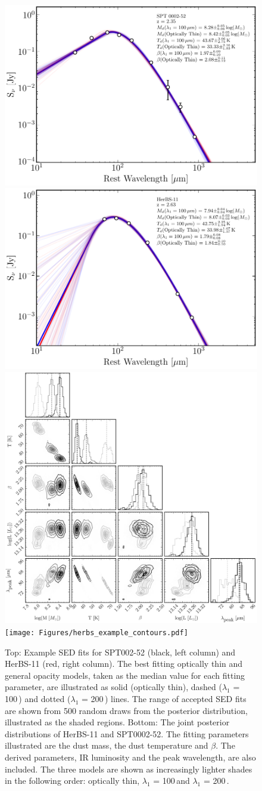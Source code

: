 \begin{figure}
	\centering
	\includegraphics[width=0.49\columnwidth]{Figures/spt_sed_example.pdf}
	\includegraphics[width=0.49\columnwidth]{Figures/herbs_sed_example.pdf}
	\includegraphics[width=0.49\columnwidth]{Figures/spt_example_contours.pdf}
	\texttt{[image: Figures/herbs\_example\_contours.pdf]}
	\caption{Top: Example SED fits for SPT002-52 (black, left column) and HerBS-11 (red, right column). The best fitting optically thin and general opacity models, taken as the median value for each fitting parameter, are illustrated as solid (optically thin), dashed ($\lambda_1$ = 100\,\micron) and dotted ($\lambda_1$ = 200\,\micron) lines. The range of accepted SED fits are shown from 500 random draws from the posterior distribution, illustrated as the shaded regions. Bottom: The joint posterior distributions of HerBS-11 and SPT0002-52. The fitting parameters illustrated are the dust mass, the dust temperature and $\beta$. The derived parameters, IR luminosity and the peak wavelength, are also included. The three models are shown as increasingly lighter shades in the following order: optically thin, $\lambda_1$ = 100\,\micron and $\lambda_1$ = 200\,\micron.}
	\label{fig:example_SEDs}
\end{figure}

